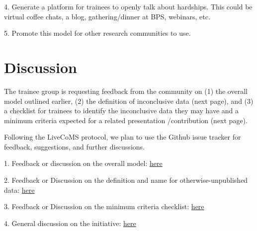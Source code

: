 \documentclass[9pt,lessons]{livecoms}
\theoremstyle{definition}
\theoremstyle{remark}
\begin{document}
4. Generate a platform for trainees to openly talk about hardships. This could be virtual coffee chats, a blog, gathering/dinner at BPS, webinars, etc.  

5. Promote this model for other research communities to use.


\section{Discussion}

The trainee group is requesting feedback from the community on (1) the overall model outlined earlier, (2) the definition of inconclusive data (next page), and (3) a checklist for trainees to 
identify the inconclusive data they may have and a minimum criteria expected for a related presentation /contribution (next page).

Following the LiveCoMS protocol, we plan to use the Github issue tracker for feedback, suggestions, and further discussions.

1. Feedback or discussion on the overall model: \href{https://github.com/Poruthoor/LearningCurveInitiative/issues/2}{here}

2. Feedback or Discussion on the definition and name for otherwise-unpublished data: \href{https://github.com/Poruthoor/LearningCurveInitiative/issues/3}{here} 

3. Feedback or Discussion on the minimum criteria checklist: \href{https://github.com/Poruthoor/LearningCurveInitiative/issues/4}{here} 

4. General discussion on the initiative: \href{https://github.com/Poruthoor/LearningCurveInitiative/discussions/6}{here} 
\end{document}
